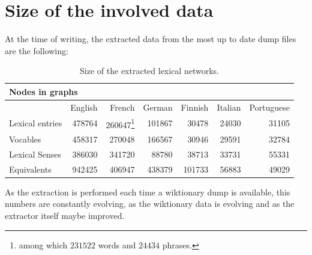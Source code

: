 \documentclass[sw]{iosart2c}
\begin{document}
\section{Size of the involved data}

At the time of writing, the extracted data from the most up to date dump files are the following:

\begin{table}[htb]
\begin{minipage}{\linewidth}
\begin{tabular}{lrrrrrr}
\multicolumn{4}{l}{\textbf{Nodes in graphs}}\\
\hline
				 & English &  French  & German & Finnish & Italian & Portuguese \\
Lexical entries &  478764 &  260647\footnote{among which $231522$ words and $24434$ phrases.}  
				 					   & 101867  &  30478 & 24030   & 31105         \\
Vocables 	     & 458317  & 270048  & 166567   & 30946 & 29591  &  32784    \\
Lexical Senses
			     & 386030  & 341720  & 88780   & 38713   &  33731  & 55331      \\
Equivalents
			     & 942425  & 406947 & 438379  & 101733 & 56883   & 49029       \\
\end{tabular}
\end{minipage}
\caption{Size of the extracted lexical networks.}
\label{table:size}
\end{table}

As the extraction is performed each time a wiktionary dump is available, this numbers are constantly evolving, as the wiktionary data is evolving and as the extractor itself maybe improved.
\end{document}
